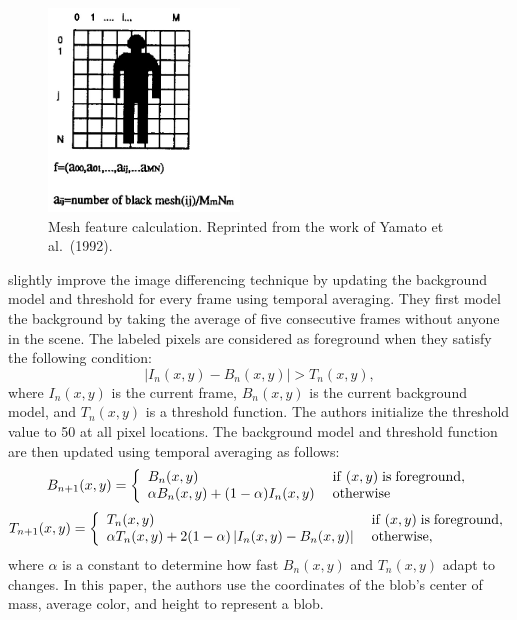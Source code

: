 \begin{figure}[t]
  \centering
  \includegraphics[width=2in]{figures/mesh-feature.jpg}  
  \caption[Mesh feature calculation]{Mesh feature
    calculation. Reprinted from the work of Yamato et al.\ (1992).}
  \label{fig:mesh-feature}
\end{figure}

 slightly improve the image differencing 
technique by updating the background model and threshold for every
frame using temporal averaging. They first model the background by
taking the average of five consecutive frames without anyone in the
scene. The labeled pixels are considered as foreground when they
satisfy the following condition:
\[
  \left|{I_n (x,y) - B_n (x,y)}\right| > T_n (x,y),
\]
where $I_n (x,y)$ is the current frame, $B_n (x,y)$ is the current
background model, and $T_n (x,y)$ is a threshold function. The authors
initialize the threshold value to 50 at all pixel locations. The
background model and threshold function are then updated using
temporal averaging as follows:
\[
B_{n + 1} (x,y) = \left\{ 
\begin{array}{l}
  B_n (x,y) \\ 
  \alpha B_n (x,y) + (1 - \alpha )I_n (x,y) \\ 
\end{array} \right.
\begin{array}{*{20}c}
  {{\rm if}\;(x,y)\;{\rm is}\;{\rm foreground},} \hfill  \\
  {{\rm otherwise}} \hfill  \\
\end{array}
\]
\[
T_{n + 1} (x,y) = \left\{ 
\begin{array}{l}
  T_n (x,y) \\ 
  \alpha T_n (x,y) + 2(1 - \alpha )\left| {I_n (x,y) - B_n (x,y)} \right| \\ 
\end{array} \right.
\begin{array}{*{20}c}
  {{\rm if}\;(x,y)\;{\rm is}\;{\rm foreground},} \hfill  \\
  {{\rm otherwise}}, \hfill  \\
\end{array}
\]
where $\alpha$ is a constant to determine how fast $B_n (x,y)$ and
$T_n (x,y)$ adapt to changes. In this paper, the authors use the
coordinates of the blob's center of mass, average color, and height to
represent a blob.


